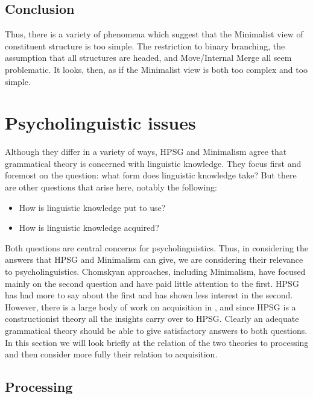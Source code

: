 \documentclass[output=paper
                ,modfonts
                ,nonflat
	        ,collection
	        ,collectionchapter
	        ,collectiontoclongg
 	        ,biblatex
                ,babelshorthands
                ,newtxmath
                ,draftmode
                ,colorlinks, citecolor=brown
]{./langsci/langscibook}
\begin{document}
\subsection{Conclusion}

Thus, there is a variety of phenomena which suggest that the Minimalist view of constituent structure
is too simple. The restriction to binary branching, the assumption that all structures are headed,
and Move/Internal Merge all seem problematic. It looks, then, as if the Minimalist view is both too
complex and too simple. 





\section{Psycholinguistic issues}
\label{sec-psycho}

Although they differ in a variety of ways, HPSG and Minimalism agree that grammatical theory is
concerned with linguistic knowledge. They focus first and foremost on the question: what form does
linguistic knowledge take? But there are other questions that arise here, notably the following: 

\begin{itemize}
\item How is linguistic knowledge put to use? 
\item How is linguistic knowledge acquired?
\end{itemize}

\noindent
Both questions are central concerns for psycholinguistics. Thus, in considering the answers that
HPSG and Minimalism can give, we are considering their relevance to psycholinguistics. Chomskyan
approaches, including Minimalism, have focused mainly on the second question and have paid little
attention to the first. HPSG has had more to say about the first and has shown less interest in the
second. However, there is a large body of work on acquisition in , and
since HPSG is a constructionist theory  all the insights carry over to HPSG. 
Clearly an adequate grammatical theory should be able to give satisfactory answers to both
questions. In this section we will look briefly at the relation of the two theories to processing
and then consider more fully their relation to acquisition.


\subsection{Processing}
\label{sec-minimalism-processing}
\end{document}
